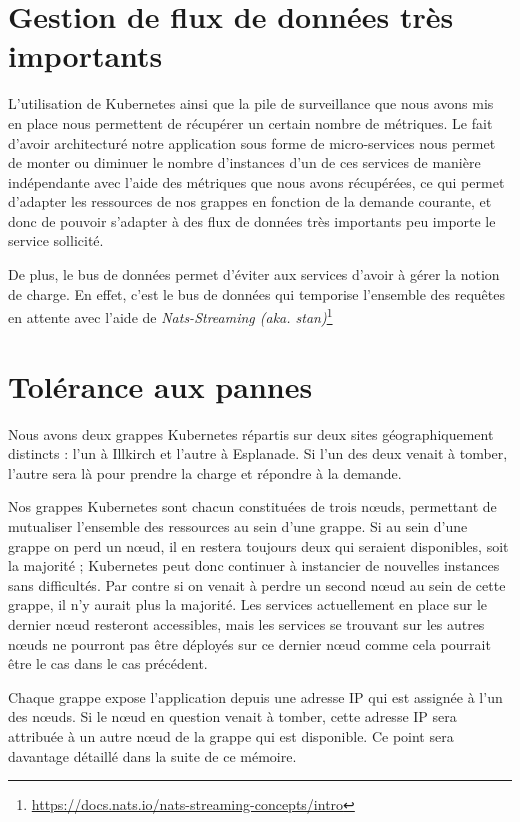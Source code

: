 \section{Gestion de flux de données très importants}

L'utilisation de Kubernetes ainsi que la pile de surveillance que nous
avons mis en place nous permettent de récupérer un certain nombre de
métriques. Le fait d'avoir architecturé notre application sous forme de
micro-services nous permet de monter ou diminuer le nombre d'instances
d'un de ces services de manière indépendante avec l'aide des métriques
que nous avons récupérées, ce qui permet d'adapter les ressources de nos
grappes en fonction de la demande courante, et donc de pouvoir
s'adapter à des flux de données très importants peu importe le service
sollicité.

De plus, le bus de données permet d'éviter aux services d'avoir à gérer
la notion de charge. En effet, c'est le bus de données qui temporise
l'ensemble des requêtes en attente avec l'aide de \textit{Nats-Streaming
(aka. stan)}\footnote{\url{https://docs.nats.io/nats-streaming-concepts/intro}}

\section{Tolérance aux pannes}

Nous avons deux grappes Kubernetes répartis sur deux sites
géographiquement distincts : l'un à Illkirch et l'autre à Esplanade. Si
l'un des deux venait à tomber, l'autre sera là pour prendre la charge et
répondre à la demande.

Nos grappes Kubernetes sont chacun constituées de trois nœuds,
permettant de mutualiser l'ensemble des ressources au sein d'une grappe.
Si au sein d'une grappe on perd un nœud, il en restera toujours deux qui
seraient disponibles, soit la majorité ; Kubernetes peut donc continuer
à instancier de nouvelles instances sans difficultés. Par contre si on
venait à perdre un second nœud au sein de cette grappe, il n'y aurait plus
la majorité. Les services actuellement en place sur le dernier nœud
resteront accessibles, mais les services se trouvant sur les autres
nœuds ne pourront pas être déployés sur ce dernier nœud comme cela
pourrait être le cas dans le cas précédent.

Chaque grappe expose l'application depuis une adresse IP qui est
assignée à l'un des nœuds. Si le nœud en question venait à tomber, cette
adresse IP sera attribuée à un autre nœud de la grappe qui est disponible.
Ce point sera davantage détaillé dans la suite de ce mémoire.

